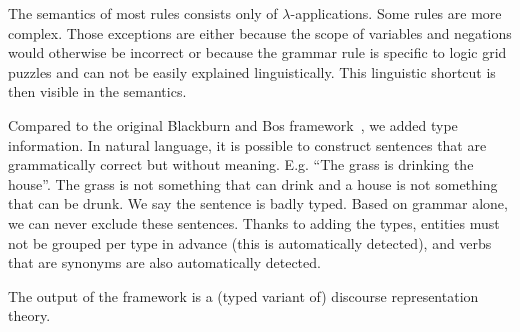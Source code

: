 The semantics of most rules consists only of $\lambda$-applications. Some rules are more complex. Those exceptions are either because the scope of variables and negations would otherwise be incorrect or because the grammar rule is specific to logic grid puzzles and can not be easily explained linguistically. This linguistic shortcut is then visible in the semantics.

Compared to the original Blackburn and Bos framework~\cite{Blackburn2005,Blackburn2006}, we added type information. In natural language, it is possible to construct sentences that are grammatically correct but without meaning. E.g. ``The grass is drinking the house''. The grass is not something that can drink and a house is not something that can be drunk. We say the sentence is badly typed. Based on grammar alone, we can never exclude these sentences. Thanks to adding the types, entities must not be grouped per type in advance (this is automatically detected), and verbs that are synonyms are also automatically detected.


The output of the framework is a (typed variant of) discourse representation theory.


